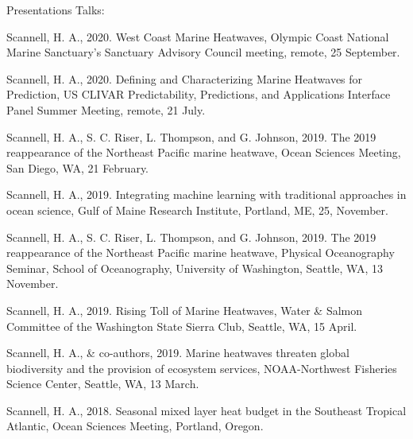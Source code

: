\documentclass{resume} %
\begin{document}



\begin{rSection}{Presentations}
Talks:
\begin{etaremune}

\item Scannell, H. A., 2020. West Coast Marine Heatwaves, Olympic Coast National Marine Sanctuary's Sanctuary Advisory Council meeting, remote, 25 September.

\item Scannell, H. A., 2020. Defining and Characterizing Marine Heatwaves for Prediction, US CLIVAR Predictability, Predictions, and Applications Interface  Panel Summer Meeting, remote, 21 July.

\item Scannell, H. A., S. C. Riser, L. Thompson, and G. Johnson, 2019. The 2019 reappearance of the Northeast Pacific marine heatwave, Ocean Sciences Meeting, San Diego, WA, 21 February.

\item Scannell, H. A., 2019. Integrating machine learning with traditional approaches in ocean science, Gulf of Maine Research Institute, Portland, ME, 25, November.

\item Scannell, H. A., S. C. Riser, L. Thompson, and G. Johnson, 2019. The 2019 reappearance of the Northeast Pacific marine heatwave, Physical Oceanography Seminar, School of Oceanography, University of Washington, Seattle, WA, 13 November.

\item Scannell, H. A., 2019. Rising Toll of Marine Heatwaves, Water \& Salmon Committee of the Washington State Sierra Club, Seattle, WA, 15 April.

\item Scannell, H. A., \& co-authors, 2019. Marine heatwaves threaten global biodiversity and the provision of ecosystem services, NOAA-Northwest Fisheries Science Center, Seattle, WA, 13 March.

\item Scannell, H. A., 2018. Seasonal mixed layer heat budget in the Southeast Tropical Atlantic, Ocean Sciences Meeting, Portland, Oregon.


\end{etaremune}
\end{rSection}
\end{document}

